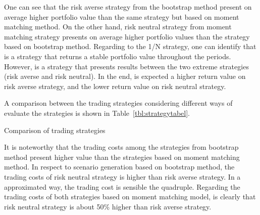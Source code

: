 One can see that the risk averse strategy from the bootstrap method present on average higher portfolio value than the same strategy but based on moment matching method.
On the other hand, risk neutral strategy from moment matching strategy presents on average higher portfolio values than the strategy based on bootstrap method.
Regarding to the 1/N strategy, one can identify that is a strategy that returns a stable portfolio value throughout the periods.
However, is a strategy that presents results between the two extreme strategies (risk averse and risk neutral).
In the end, is expected a higher return value on risk averse strategy, and the lower return value on risk neutral strategy.

A comparison between the trading strategies considering different ways of evaluate the strategies is shown in Table~\ref{tbl:strategytabel}.

\begin{table}[tpbh]
\caption{Comparison of trading strategies}\label{tbl:strategytabel}
\centering

\end{table}

It is noteworthy that the trading costs among the strategies from bootstrap method present higher value than the strategies based on moment matching method.
In respect to scenario generation based on bootstrap method, the trading costs of risk neutral strategy is higher than risk averse strategy. 
In a approximated way, the trading cost is sensible the quadruple.
Regarding the trading costs of both strategies based on moment matching model, is clearly that risk neutral strategy is about 50\% higher than risk averse strategy.
 

